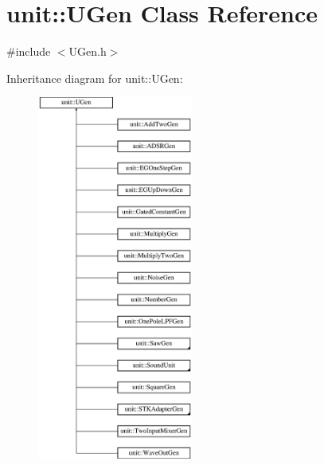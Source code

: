 \hypertarget{classunit_1_1UGen}{}\section{unit\+:\+:U\+Gen Class Reference}
\label{classunit_1_1UGen}


{\ttfamily \#include $<$U\+Gen.\+h$>$}

Inheritance diagram for unit\+:\+:U\+Gen\+:\begin{figure}[H]
\begin{center}
\leavevmode
\includegraphics[height=12.000000cm]{classunit_1_1UGen}
\end{center}
\end{figure}
